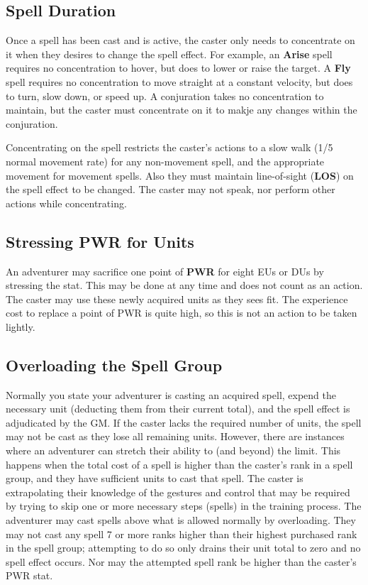 \begin{multicols*}{2}
\subsection{Spell Duration}
Once a spell has been cast and is active, the caster only needs to concentrate on it when they desires to change the
spell effect. For example, an \textbf{Arise} spell requires no concentration to hover, but does to lower or raise the target. A \textbf{Fly} spell requires no concentration to move straight at a constant velocity, but does to turn, slow down, or speed up. A conjuration takes no concentration to maintain, but the caster
must concentrate on it to makje any changes within the conjuration.

Concentrating on the spell restricts the caster’s actions to a slow walk (1/5 normal movement rate) for any non-movement spell, and the appropriate movement for movement spells. Also they must maintain line-of-sight (\textbf{LOS}) on the spell effect to be changed. The caster may not speak, nor perform other actions while concentrating.
\subsection{Stressing PWR for Units}
An adventurer may sacrifice one point of \textbf{PWR} for eight EUs or DUs by stressing the stat. This may be done at any time and does not count as an action. The caster may use these newly acquired units as they sees fit. The experience cost to replace a point of PWR is quite high, so this is not an action to be taken lightly.
\subsection{Overloading the Spell Group}
Normally you state your adventurer is casting an acquired spell, expend the necessary unit (deducting them from their current total), and the spell effect is adjudicated by the GM. If the caster lacks the required number of units, the spell may not be cast as they lose all remaining units. However, there are instances where an adventurer can stretch their ability to (and beyond) the limit.
This happens when the total cost of a spell is higher than the caster’s rank in a spell group, and they have sufficient
units to cast that spell. The caster is extrapolating their knowledge of the gestures and control that may be required by trying to skip one or more necessary steps (spells) in the training process. The adventurer may cast spells above what is allowed normally by overloading. They may not cast any spell 7 or more ranks higher than their highest purchased rank in the spell group; attempting to do so only drains their unit
total to zero and no spell effect occurs. Nor may the attempted spell rank be higher than the caster’s PWR stat.


\end{multicols*}
